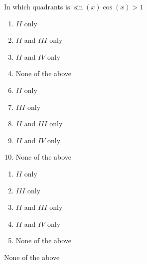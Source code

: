 

  In which quadrants is $\sin(x)\cos(x)>1$


\ifsat
	\begin{enumerate}[label=\Alph*)]
		\item    $II$ only
		\item $II$ and $III$ only 
		\item $II$ and $IV$ only 
		\item  None of the above %
	\end{enumerate}
\else
\fi

\ifacteven
	\begin{enumerate}[label=\textbf{\Alph*.},itemsep=\fill,align=left]
		\setcounter{enumii}{5}
		\item    $II$ only
		\item  $III$ only 
		\item $II$ and $III$ only 
		\addtocounter{enumii}{1}
		\item $II$ and $IV$ only 
		\item  None of the above %
	\end{enumerate}
\else
\fi

\ifactodd
	\begin{enumerate}[label=\textbf{\Alph*.},itemsep=\fill,align=left]
		\item    $II$ only
		\item  $III$ only 
		\item $II$ and $III$ only 
		\item $II$ and $IV$ only 
		\item  None of the above %
	\end{enumerate}
\else
\fi

\ifgridin
  None of the above %

\else
\fi

